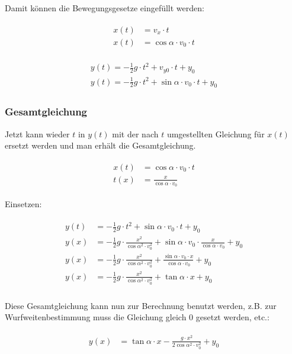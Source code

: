 \noindent Damit können die Bewegungsgesetze eingefüllt werden:

\begin{align}
\begin{split}
	x(t) &= v_x \cdot t \\
	x(t) &= \cos{\alpha} \cdot v_0 \cdot t
\end{split}
\end{align}

\begin{align}
\begin{split}
	y(t) = -\frac{1}{2}g \cdot t^2 + v_{y0} \cdot t + y_0 \\
	y(t) = -\frac{1}{2}g \cdot t^2 + \sin{\alpha} \cdot v_0 \cdot t + y_0
\end{split}
\end{align}


\subsubsection{Gesamtgleichung}


Jetzt kann wieder $t$ in $y(t)$ mit der nach $t$ umgestellten Gleichung für $x(t)$ ersetzt werden und man erhält die Gesamtgleichung.

\begin{align}
\begin{split}
	x(t) &= \cos{\alpha} \cdot v_0 \cdot t \\
	t(x) &= \frac{x}{\cos{\alpha} \cdot v_0}
\end{split}
\end{align}

\noindent Einsetzen:

\begin{align}
\begin{split}
	y(t) &= -\frac{1}{2}g \cdot t^2 + \sin{\alpha} \cdot v_0 \cdot t + y_0 \\
	y(x) &= -\frac{1}{2}g \cdot \frac{x^2}{\cos{\alpha}^2 \cdot v_0^2} + \sin{\alpha} \cdot v_0 \cdot \frac{x}{\cos{\alpha} \cdot v_0} + y_0 \\
	y(x) &= -\frac{1}{2}g \cdot \frac{x^2}{\cos{\alpha}^2 \cdot v_0^2} + \frac{\sin{\alpha} \cdot v_0 \cdot x}{\cos{\alpha} \cdot v_0} + y_0 \\
	y(x) &= -\frac{1}{2}g \cdot \frac{x^2}{\cos{\alpha}^2 \cdot v_0^2} + \tan{\alpha} \cdot x + y_0 \\
\end{split}
\end{align}

\noindent Diese Gesamtgleichung kann nun zur Berechnung benutzt werden, z.B. zur Wurfweitenbestimmung muss die Gleichung gleich $0$ gesetzt werden, etc.:

\begin{align}
\begin{split}
	y(x) &= \tan{\alpha} \cdot x - \frac{g \cdot x^2}{2\cos{\alpha}^2 \cdot v_0^2} + y_0
\end{split}
\end{align}